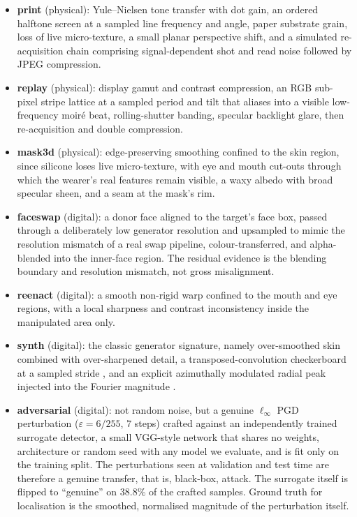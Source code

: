 \documentclass[conference]{IEEEtran}
\begin{document}
\begin{itemize}
\item \textbf{print} (physical): Yule--Nielsen tone transfer with dot gain, an
      ordered halftone screen at a sampled line frequency and angle, paper
      substrate grain, loss of live micro-texture, a small planar perspective
      shift, and a simulated re-acquisition chain comprising signal-dependent shot
      and read noise followed by JPEG compression.
\item \textbf{replay} (physical): display gamut and contrast compression, an RGB
      sub-pixel stripe lattice at a sampled period and tilt that aliases into a
      visible low-frequency moir\'e beat, rolling-shutter banding, specular
      backlight glare, then re-acquisition and double compression.
\item \textbf{mask3d} (physical): edge-preserving smoothing confined to the skin
      region, since silicone loses live micro-texture, with eye and mouth cut-outs
      through which the wearer's real features remain visible, a waxy albedo with
      broad specular sheen, and a seam at the mask's rim.
\item \textbf{faceswap} (digital): a donor face aligned to the target's face box,
      passed through a deliberately low generator resolution and upsampled to mimic
      the resolution mismatch of a real swap pipeline, colour-transferred, and
      alpha-blended into the inner-face region. The residual evidence is the
      blending boundary and resolution mismatch, not gross misalignment.
\item \textbf{reenact} (digital): a smooth non-rigid warp confined to the mouth and
      eye regions, with a local sharpness and contrast inconsistency inside the
      manipulated area only.
\item \textbf{synth} (digital): the classic generator signature, namely
      over-smoothed skin combined with over-sharpened detail, a
      transposed-convolution checkerboard at a sampled stride
      \cite{odena2016checkerboard}, and an explicit azimuthally modulated radial
      peak injected into the Fourier magnitude \cite{frank2020frequency}.
\item \textbf{adversarial} (digital): not random noise, but a genuine
      $\ell_\infty$ PGD perturbation ($\varepsilon=6/255$, $7$ steps)
      \cite{madry2018pgd} crafted against an independently trained surrogate
      detector, a small VGG-style network that shares no weights, architecture or
      random seed with any model we evaluate, and is fit only on the training
      split. The perturbations seen at validation and test time are therefore a
      genuine transfer, that is, black-box, attack. The surrogate itself is flipped
      to ``genuine'' on $38.8\%$ of the crafted samples. Ground truth for
      localisation is the smoothed, normalised magnitude of the perturbation itself.
\end{itemize}
\end{document}
